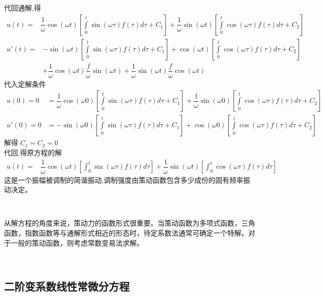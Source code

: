 代回通解,得
			$$ \begin{aligned}
				u(t)=&\dfrac{1}{\omega}\cos(\omega t)\left[\int\limits_{0}^{t} \sin(\omega \tau) f(\tau)  d\tau +C_1 \right] +\dfrac{1}{\omega} \sin(\omega t) \left[\int\limits_{0}^{t} \cos(\omega \tau) f(\tau)  d\tau +C_2 \right]
			\end{aligned}  $$
			$$ \begin{aligned}
				u'(t)=&-\sin(\omega t)\left[\int\limits_{0}^{t} \sin(\omega \tau) f(\tau)  d\tau +C_1 \right] +\cos(\omega t) \left[\int\limits_{0}^{t} \cos(\omega \tau) f(\tau)  d\tau +C_2 \right] \\
				&+ \dfrac{1}{\omega}\cos(\omega t) \dfrac{f}{\omega} \sin(\omega t)  + \dfrac{1}{\omega} \sin(\omega t) \dfrac{f}{\omega} \cos(\omega t)
			\end{aligned}  $$
代入定解条件
\[
\begin{aligned}
	u(0)=0 &= \dfrac{1}{\omega}\cos(\omega 0)\left[\int\limits_{0}^{t} \sin(\omega \tau) f(\tau)  d\tau +C_1 \right] +\dfrac{1}{\omega} \sin(\omega 0) \left[\int\limits_{0}^{t} \cos(\omega \tau) f(\tau)  d\tau +C_2 \right] \\
	u'(0)=0 &=  -\sin(\omega 0)\left[\int\limits_{0}^{t} \sin(\omega \tau) f(\tau)  d\tau +C_1 \right] +\cos(\omega 0) \left[\int\limits_{0}^{t} \cos(\omega \tau) f(\tau)  d\tau +C_2 \right]
\end{aligned}
\]
解得  $C_1=C_2=0$ \\
代回,得原方程的解
$$ \begin{aligned}
	u(t)=&\dfrac{1}{\omega}\cos(\omega t)\left[\int_{0}^{t} \sin(\omega \tau) f(\tau)  d\tau \right] +\dfrac{1}{\omega} \sin(\omega t) \left[\int_{0}^{t} \cos(\omega \tau) f(\tau)  d\tau \right]
\end{aligned}  $$
这是一个振幅被调制的简谐振动,调制强度由策动函数包含多少成份的固有频率振动决定。

~~\\ 
\begin{hint}
	从解方程的角度来说，策动力的函数形式很重要。当策动函数为多项式函数，三角函数，指数函数等与通解形式相近的形态时，待定系数法通常可确定一个特解。对于一般的策动函数，则考虑常数变易法求解。
\end{hint} ~\\

\subsection{二阶变系数线性常微分方程} ~\\


